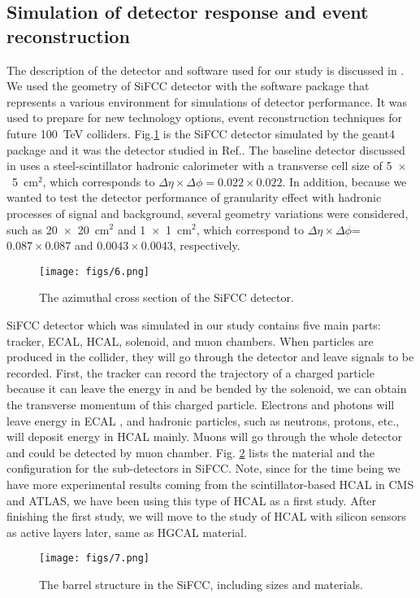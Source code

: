\documentclass[12pt,twoside,a4paper,an,final]{cms-tdr}
\begin{document}
\subsection{Simulation of detector response and event reconstruction}
 
The description of the detector and software used for our study is discussed in \cite{Chekanov:2016ppq}. We used the geometry of SiFCC detector with the software package that represents a various environment for simulations of detector performance. It was used to prepare for new technology options, event reconstruction techniques for future 100~TeV colliders. Fig.\ref{fig:SiFCC} is the SiFCC detector simulated by the {\sc geant4} package\cite{Allison2016186} and it was the detector studied in Ref.\cite{Chekanov:2016ppq}. The baseline detector discussed in \cite{Chekanov:2016ppq} uses a steel-scintillator hadronic calorimeter with a transverse cell size of 5~$\times$~5~cm$^2$, which corresponds to $\Delta \eta \times \Delta \phi = 0.022\times0.022$. In addition, because we wanted to test the detector performance of granularity effect with hadronic processes of signal and background, several geometry variations were considered, such as 20~$\times$~20~cm$^2$ and  1~$\times$~1~cm$^2$, which correspond to $\Delta \eta \times \Delta \phi$= $0.087\times0.087$ and  $0.0043\times0.0043$, respectively.\\

\begin{figure}
\begin{center}
\texttt{[image: figs/6.png]}
\end{center}
\caption{The azimuthal cross section of the SiFCC detector.}
\label{fig:SiFCC}
\end{figure}

SiFCC detector which was simulated in our study contains five main parts: tracker, ECAL, HCAL, solenoid, and muon chambers. When particles are produced in the collider, they will go through the detector and leave signals to be recorded. First, the tracker can record the trajectory of a charged particle because it can leave the energy in and be bended by the solenoid, we can obtain the transverse momentum of this charged particle. Electrons and photons will leave energy in ECAL , and hadronic particles, such as neutrons, protons, etc., will deposit energy in HCAL mainly. Muons will go through the whole detector and could be detected by muon chamber. Fig. \ref{fig:barrel_size_material} lists the material and the configuration for the sub-detectors in SiFCC. Note, since for the time being we have more experimental results coming from the scintillator-based HCAL in CMS and ATLAS, we have been using this type of HCAL as a first study. After finishing the first study, we will move to the study of HCAL with silicon sensors as active layers later, same as HGCAL material.\\ 
\begin{figure}
\begin{center}
\texttt{[image: figs/7.png]}
\end{center}
\caption{The barrel structure in the SiFCC, including sizes and materials.}
\label{fig:barrel_size_material}
\end{figure}
\end{document}
